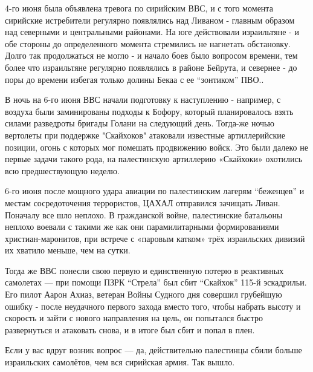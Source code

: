 4-го июня была объявлена тревога по сирийским ВВС, и с того момента сирийские истребители регулярно появлялись над Ливаном - главным образом над северными и центральными районами. На юге действовали израильтяне - и обе стороны до определенного момента стремились не нагнетать обстановку. Долго так продолжаться не могло - и начало боев было вопросом времени, тем более что израильтяне регулярно появлялись в районе Бейрута, и севернее - до поры до времени избегая только долины Бекаа с ее “зонтиком” ПВО..

В ночь на 6-го июня ВВС начали подготовку к наступлению - например, с воздуха были заминированы подходы к Бофору, который планировалось взять силами разведроты бригады Голани на следующий день. Тогда-же ночью вертолеты при поддержке "Скайхоков" атаковали известные артиллерийские позиции, огонь с которых мог помешать продвижению войск. Это были далеко не первые задачи такого рода, на палестинскую артиллерию «Скайхоки» охотились всю предшествующую неделю.

6-го июня после мощного удара авиации по палестинским лагерям “беженцев” и местам сосредоточения террористов, ЦАХАЛ отправился зачищать Ливан. Поначалу все шло неплохо. В гражданской войне, палестинские батальоны неплохо воевали с такими же как они парамилитарными формированиями христиан-маронитов, при встрече с «паровым катком» трёх израильских дивизий их хватило меньше, чем на сутки.

Тогда же ВВС понесли свою первую и единственную потерю в реактивных самолетах — при помощи ПЗРК “Стрела” был сбит “Скайхок” 115-й эскадрильи. Его пилот Аарон Ахиаз, ветеран Войны Судного дня совершил грубейшую ошибку - после неудачного первого захода вместо того, чтобы набрать высоту и скорость и зайти с нового направления на цель, он попытался быстро развернуться и атаковать снова, и в итоге был сбит и попал в плен.

Если у вас вдруг возник вопрос — да, действительно палестинцы сбили больше израильских самолётов, чем вся сирийская армия. Так вышло.

